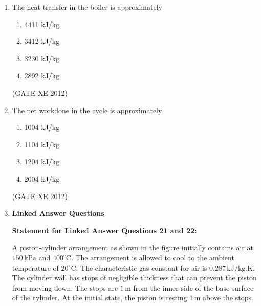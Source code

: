 \documentclass[12pt]{article}
\begin{document}
\begin{enumerate}
\textbf{Common Data for Questions 19 and 20:}

Consider an ideal reheat cycle utilizing steam. Steam leaves the boiler and enters the turbine at 3 MPa, 400$^\circ$C (state 3) and then expands to 0.8 MPa (state 4). It is then reheated at constant pressure 0.8 MPa to 400$^\circ$C (state 5) and expands to 10 kPa in the low pressure turbine (state 6). The entry to the pump corresponds to saturated liquid state (state 1), and state 2 represents inlet to the boiler. The following data are given:

$h_{1} = 191.81 \,\text{kJ/kg}, \quad h_{3} = 323.082 \,\text{kJ/kg}, \quad h_{4} = 2891.6 \,\text{kJ/kg},$  $h_{5} = 3267.97 \,\text{kJ/kg},$

$h_{g}|_{10kPa} = 2584.63 \,\text{kJ/kg}, \quad x_{6} = 0.92285 , \quad v_{f}|_{10kPa} = 0.00101 \,\text{m}^3/\text{kg}$  

\item The heat transfer in the boiler is approximately
\begin{multicols}{2}
\begin{enumerate}
\item 4411 kJ/kg
\item 3412 kJ/kg
\item 3230 kJ/kg
\item 2892 kJ/kg
\end{enumerate}
\end{multicols}
(GATE XE 2012)

\item The net workdone in the cycle is approximately
\begin{multicols}{2}
\begin{enumerate}
\item 1004 kJ/kg
\item 1104 kJ/kg
\item 1204 kJ/kg
\item 2004 kJ/kg
\end{enumerate}
\end{multicols}
(GATE XE 2012)

\item[] {\large \textbf{Linked Answer Questions}}

\textbf{Statement for Linked Answer Questions 21 and 22:}  

A piston-cylinder arrangement as shown in the figure initially contains air at $150 \,\text{kPa}$ and $400^{\circ}\text{C}$. The arrangement is allowed to cool to the ambient temperature of $20^{\circ}\text{C}$. The characteristic gas constant for air is $0.287 \,\text{kJ/kg.K}$. The cylinder wall has stops of negligible thickness that can prevent the piston from moving down. The stops are $1 \,\text{m}$ from the inner side of the base surface of the cylinder. At the initial state, the piston is resting $1 \,\text{m}$ above the stops.


\end{enumerate}
\end{document}
